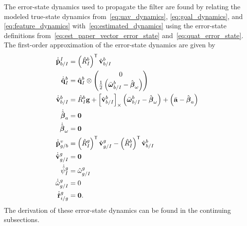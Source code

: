 The error-state dynamics used to propagate the filter are found by relating
the modeled true-state dynamics from~\eqref{eq:uav_dynamics},
\eqref{eq:goal_dynamics}, and \eqref{eq:feature_dynamics}
with~\eqref{eq:estimated_dynamics} using the error-state definitions
from~\eqref{eq:est_paper_vector_error_state} and~\eqref{eq:quat_error_state}. The
first-order approximation of the error-state dynamics are given by 
\begin{align}
  \dot{\hat{\boldsymbol{\mathrm{p}}}}_{b/I}^I
  &=
  \left( \hat{R}_I^b \right)^{\mathsf{T}} \hat{\boldsymbol{\mathrm{v}}}_{b/I}^b
  \\
  \dot{\hat{\boldsymbol{\mathrm{q}}}}_{I}^{b} 
  &= 	
  \hat{\boldsymbol{\mathrm{q}}}_I^b \otimes \begin{pmatrix} 0 \\ \frac{1}{2}
  \left( \bar{\boldsymbol{\mathrm{\omega}}}_{b/I}^b - \hat{\boldsymbol{\mathrm{\beta}}}_\omega \right)
\end{pmatrix} \nonumber \\
  \dot{\hat{\boldsymbol{\mathrm{v}}}}_{b/I}^b 
  &=
  \hat{R}_I^b \boldsymbol{\mathrm{g}}
  +
  \left[ \hat{\boldsymbol{\mathrm{v}}}_{b/I}^b \right]_{\times}
  \left( \bar{\boldsymbol{\mathrm{\omega}}}_{b/I}^b - \hat{\boldsymbol{\mathrm{\beta}}}_\omega \right)
  +
  \left( \bar{\boldsymbol{\mathrm{a}}} - \hat{\boldsymbol{\mathrm{\beta}}}_a \right) \nonumber
  \\
  \dot{\hat{\boldsymbol{\mathrm{\beta}}}}_a &= \boldsymbol{\mathrm{0}} \nonumber
  \\
  \dot{\hat{\boldsymbol{\mathrm{\beta}}}}_\omega &= \boldsymbol{\mathrm{0}} \nonumber
  \\
  \dot{\hat{\boldsymbol{\mathrm{p}}}}_{g/b}^{v} &= \left( \hat{R}_{I}^{g} \right)^{\mathsf{T}}
  \hat{\boldsymbol{\mathrm{v}}}_{g/I}^{g} - \left( \hat{R}_{I}^{b} \right)^{\mathsf{T}}
  \hat{\boldsymbol{\mathrm{v}}}_{b/I}^{b} \nonumber \\
  \dot{\hat{\boldsymbol{\mathrm{v}}}}_{g/I}^{g} &= \boldsymbol{\mathrm{0}} \nonumber \\
  \dot{\hat{\psi}}_{I}^{g} &= \hat{\omega}_{g/I}^g \nonumber \\
  \dot{\hat{\omega}}_{g/I}^{g} &= 0 \nonumber \\
  \dot{\hat{\boldsymbol{\mathrm{r}}}}_{i/g}^g &= \boldsymbol{\mathrm{0}}. \nonumber
\end{align}
The derivation of these error-state dynamics can be found in the continuing
subsections.

